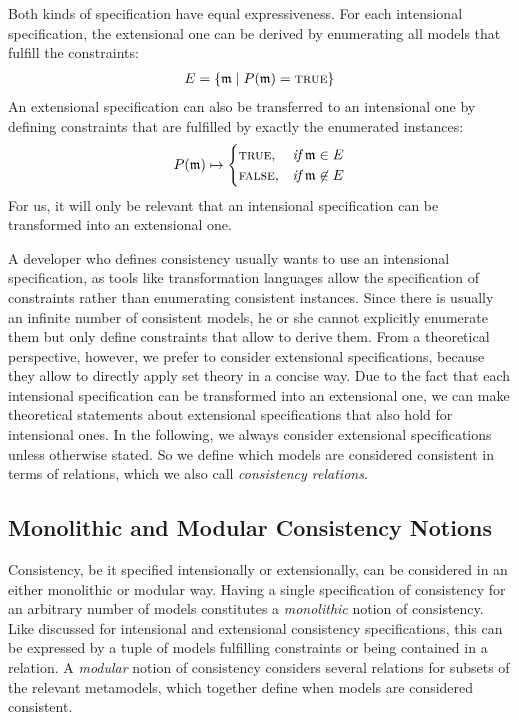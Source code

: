 Both kinds of specification have equal expressiveness. For each intensional specification, the extensional one can be derived by enumerating all models that fulfill the constraints:
\begin{align*}
    E = \setted{\modeltuple{m} \mid P(\modeltuple{m}) = \truemath}
\end{align*}
An extensional specification can also be transferred to an intensional one by defining constraints that are fulfilled by exactly the enumerated instances:
\begin{align*}
    P(\modeltuple{m}) \mapsto 
    \begin{cases} 
        \truemath, & \ifmath \modeltuple{m} \in E\\
        \falsemath, & \ifmath \modeltuple{m} \not\in E\\
    \end{cases}
\end{align*}
For us, it will only be relevant that an intensional specification can be transformed into an extensional one.

A developer who defines consistency usually wants to use an intensional specification, as tools like transformation languages allow the specification of constraints rather than enumerating consistent instances.
Since there is usually an infinite number of consistent models, he or she cannot explicitly enumerate them but only define constraints that allow to derive them.
From a theoretical perspective, however, we prefer to consider extensional specifications, because they allow to directly apply set theory in a concise way.
Due to the fact that each intensional specification can be transformed into an extensional one, we can make theoretical statements about extensional specifications that also hold for intensional ones.
In the following, we always consider extensional specifications unless otherwise stated.
So we define which models are considered consistent in terms of relations, which we also call \emph{consistency relations}.


\subsection{Monolithic and Modular Consistency Notions}
\label{chap:correctness:notions_consistency:monolithic_modular}

Consistency, be it specified intensionally or extensionally, can be considered in an either monolithic or modular way.
Having a single specification of consistency for an arbitrary number of models constitutes a \emph{monolithic} notion of consistency.
Like discussed for intensional and extensional consistency specifications, this can be expressed by a tuple of models fulfilling constraints or being contained in a relation.
A \emph{modular} notion of consistency considers several relations for subsets of the relevant metamodels, which together define when models are considered consistent.


